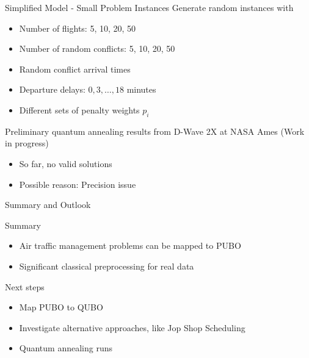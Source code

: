 \documentclass[10pt]{beamer}
\begin{document}
\begin{frame}[t]{Simplified Model - Small Problem Instances}
    Generate random instances with
    \begin{itemize}
        \item Number of flights: 5, 10, 20, 50
        \item Number of random conflicts: 5, 10, 20, 50
        \item Random conflict arrival times
        \item Departure delays: $0, 3, \dots, 18$ minutes
        \item Different sets of penalty weights $p_i$
    \end{itemize}
    \begin{block}
        {Preliminary quantum annealing results from D-Wave 2X at NASA Ames (Work in progress)}
        \begin{itemize}
            \item So far, no valid solutions
            \item Possible reason: Precision issue
        \end{itemize}
    \end{block}
\end{frame}
\begin{frame}[t]{Summary and Outlook}
    \begin{block}{Summary}
        \begin{itemize}
            \item Air traffic management problems can be mapped to PUBO
            \item Significant classical preprocessing for real data
        \end{itemize}
    \end{block}
    \begin{block}{Next steps}
        \begin{itemize}
            \item Map PUBO to QUBO
            \item Investigate alternative approaches, like Jop Shop Scheduling
            \item Quantum annealing runs
        \end{itemize}
    \end{block}
\end{frame}
\end{document}
